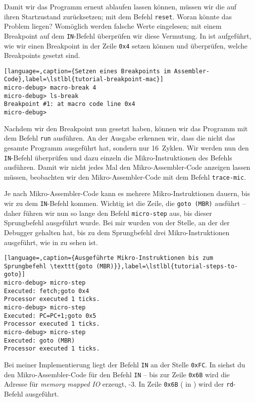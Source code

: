 Damit wir das Programm erneut ablaufen lassen können, müssen wir die \mic{} auf ihren Startzustand zurücksetzen; mit dem Befehl \texttt{reset}. Woran könnte das Problem liegen? Womöglich werden falsche Werte eingelesen; mit einem Breakpoint auf dem \texttt{IN}-Befehl überprüfen wir diese Vermutung. In  ist aufgeführt, wie wir einen Breakpoint in der Zeile \texttt{0x4} setzen können und überprüfen, welche Breakpoints gesetzt sind.

\begin{lstlisting}[language=,caption={Setzen eines Breakpoints im Assembler-Code},label=\lstlbl{tutorial-breakpoint-mac}]
micro-debug> macro-break 4
micro-debug> ls-break
Breakpoint #1: at macro code line 0x4
micro-debug> 
\end{lstlisting}

Nachdem wir den Breakpoint nun gesetzt haben, können wir das Programm mit dem Befehl \texttt{run} ausführen. An der Ausgabe erkennen wir, dass die \mic{} nicht das gesamte Programm ausgeführt hat, sondern nur 16~Zyklen. Wir werden nun den \texttt{IN}-Befehl überprüfen und dazu einzeln die Mikro-Instruktionen des Befehls ausführen. Damit wir nicht jedes Mal den Mikro-Assembler-Code anzeigen lassen müssen, beobachten wir den Mikro-Assembler-Code mit dem Befehl \texttt{trace-mic}.

Je nach Mikro-Assembler-Code kann es mehrere Mikro-Instruktionen dauern, bis wir zu dem \texttt{IN}-Befehl kommen. Wichtig ist die Zeile, die \texttt{goto (MBR)} ausführt -- daher führen wir nun so lange den Befehl \texttt{micro-step} aus, bis dieser Sprungbefehl ausgeführt wurde. Bei mir wurden von der Stelle, an der der Debugger gehalten hat, bis zu dem Sprungbefehl drei Mikro-Instruktionen ausgeführt, wie in  zu sehen ist.

\begin{lstlisting}[language=,caption={Ausgeführte Mikro-Instruktionen bis zum Sprungbefehl \texttt{goto (MBR)}},label=\lstlbl{tutorial-steps-to-goto}]
micro-debug> micro-step
Executed: fetch;goto 0x4
Processor executed 1 ticks.
micro-debug> micro-step
Executed: PC=PC+1;goto 0x5
Processor executed 1 ticks.
micro-debug> micro-step
Executed: goto (MBR)
Processor executed 1 ticks.
\end{lstlisting}

Bei meiner Implementierung liegt der Befehl \texttt{IN} an der Stelle \texttt{0xFC}. In  siehst du den Mikro-Assembler-Code für den Befehl \texttt{IN} -- bis zur Zeile \texttt{0x6B} wird die Adresse für \emph{memory mapped IO} erzeugt, -3. In Zeile \texttt{0x6B} ( in ) wird der \texttt{rd}-Befehl ausgeführt.

